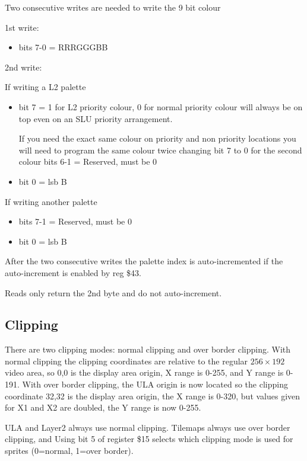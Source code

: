 Two consecutive writes are needed to write the 9 bit colour

1st write:

\begin{itemize}
\item bits 7-0 = RRRGGGBB
\end{itemize}

2nd write: 

If writing a L2 palette

\hrulefill
\begin{itemize}
\item bit 7 = 1 for L2 priority colour, 0 for normal priority colour will always be on top even on an SLU priority arrangement. 

If you need the exact same colour on priority and non priority
locations you will need to program the same colour twice changing bit
7 to 0 for the second colour bits 6-1 = Reserved, must be 0

\item bit 0 = lsb B
\end{itemize}
     
If writing another palette

\hrulefill
\begin{itemize}
\item bits 7-1 = Reserved, must be 0
\item bit 0 = lsb B
\end{itemize}           
After the two consecutive writes the palette index is auto-incremented
if the auto-increment is enabled by reg \$43.
     
Reads only return the 2nd byte and do not auto-increment.

\subsection{Clipping}

There are two clipping modes: normal clipping and over border
clipping. With normal clipping the clipping coordinates are relative
to the regular $256\times192$ video area, so 0,0 is the display area origin,
X range is 0-255, and Y range is 0-191. With over border clipping, the
ULA origin is now located so the clipping coordinate 32,32 is the
display area origin, the X range is 0-320, but values given for X1 and
X2 are doubled, the Y range is now 0-255.

ULA and Layer2 always use normal clipping.  Tilemaps always use over
border clipping, and Using bit 5 of register \$15 selects which
clipping mode is used for sprites (0=normal, 1=over border).

